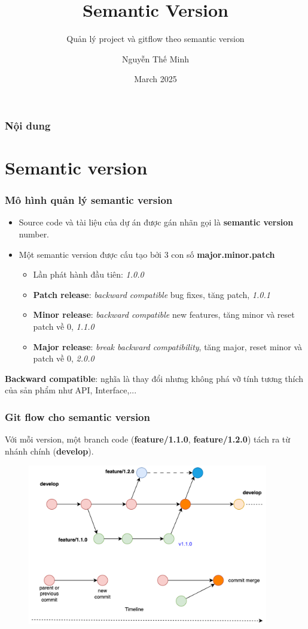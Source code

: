 \documentclass{beamer}
\title[Semantic version]{Semantic Version}
\subtitle{Quản lý project và gitflow theo semantic version}
\author[minhnt@nal.vn]{Nguyễn Thế Minh}
\date[March 2025]{March 2025}
\begin{document}
\frame{\titlepage}
\begin{frame}
\frametitle{Nội dung}
\tableofcontents
\end{frame}

\section{Semantic version}
\begin{frame}
\frametitle{Mô hình quản lý semantic version}
\begin{itemize}
\item Source code và tài liệu của dự án được gán nhãn gọi là \textbf{semantic version} number.
\item Một semantic version được cấu tạo bởi 3 con số \textbf{major.minor.patch}
    \begin{itemize}
    \item Lần phát hành đầu tiên: \textit{1.0.0}
    \item \textbf{Patch release}: \textit{backward compatible} bug fixes, tăng patch, \textit{1.0.1}
    \item \textbf{Minor release}: \textit{backward compatible} new features, tăng minor và reset patch về 0, \textit{1.1.0}
    \item \textbf{Major release}: \textit{break backward compatibility}, tăng major, reset minor và patch về 0, \textit{2.0.0}
    \end{itemize}
\end{itemize}
\begin{definition}
\textbf{Backward compatible}: nghĩa là thay đổi nhưng không phá vỡ tính tương thích của sản phẩm như API, Interface,...
\end{definition}
\end{frame}

\begin{frame}
\frametitle{Git flow cho semantic version}
Với mỗi version, một branch code (\textbf{feature/1.1.0}, \textbf{feature/1.2.0}) tách ra từ nhánh chính (\textbf{develop}).
\begin{figure}[h!]
  \includegraphics[height=7cm]{git-flow-overview.png}
\end{figure}
\end{frame}
\end{document}
